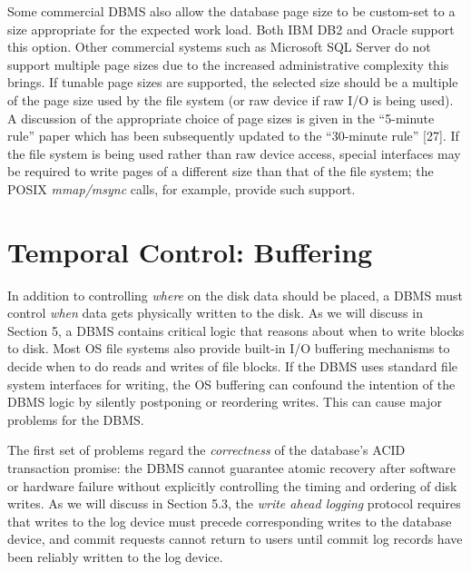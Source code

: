 \documentclass[a4paper,11pt,twoside,openright]{book}
\begin{document}
Some commercial DBMS also allow the database page size to be custom-set
to a size appropriate for the expected work load. Both IBM DB2 and
Oracle support this option. Other commercial systems such as Microsoft
SQL Server do not support multiple page sizes due to the increased
administrative complexity this brings. If tunable page sizes are
supported, the selected size should be a multiple of the page size used
by the file system (or raw device if raw I/O is being used). A
discussion of the appropriate choice of page sizes is given in the
``5-minute rule'' paper which has been subsequently updated to the
``30-minute rule'' {[}27{]}. If the file system is being used rather
than raw device access, special interfaces may be required to write
pages of a different size than that of the file system; the POSIX
\emph{mmap/msync} calls, for example, provide such support.

\hypertarget{temporal-control-buffering}{%
\section{Temporal Control:
Buffering}\label{temporal-control-buffering}}

In addition to controlling \emph{where} on the disk data should be
placed, a DBMS must control \emph{when} data gets physically written to
the disk. As we will discuss in Section 5, a DBMS contains critical
logic that reasons about when to write blocks to disk. Most OS file
systems also provide built-in I/O buffering mechanisms to decide when to
do reads and writes of file blocks. If the DBMS uses standard file
system interfaces for writing, the OS buffering can confound the
intention of the DBMS logic by silently postponing or reordering writes.
This can cause major problems for the DBMS.

The first set of problems regard the \emph{correctness} of the
database's ACID transaction promise: the DBMS cannot guarantee atomic
recovery after software or hardware failure without explicitly
controlling the timing and ordering of disk writes. As we will discuss
in Section 5.3, the \emph{write ahead logging} protocol requires that
writes to the log device must precede corresponding writes to the
database device, and commit requests cannot return to users until commit
log records have been reliably written to the log device.
\end{document}
